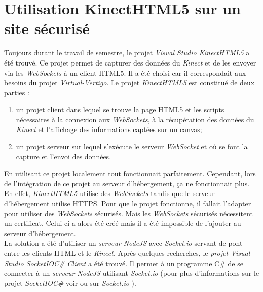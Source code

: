 \section*{Utilisation KinectHTML5 sur un site sécurisé}  \label{probKinectHTML5}
Toujours durant le travail de semestre, le projet \textit{Visual Studio KinectHTML5} \cite{KinectHTML5} a été trouvé. Ce projet permet de capturer des données du \textit{Kinect} et de les envoyer via les \textit{WebSockets} à un client HTML5. Il a été choisi car il correspondait aux besoins du projet \textit{Virtual-Vertigo}. Le projet \textit{KinectHTML5} est constitué de deux parties :
\begin{enumerate}
\item un projet client dans lequel se trouve la page HTML5 et les scripts nécessaires à la connexion aux \textit{WebSockets}, à la récupération des données du \textit{Kinect} et l'affichage des informations captées sur un canvas;
\item un projet serveur sur lequel s'exécute le serveur \textit{WebSocket} et où se font la capture et l'envoi des données.\\

\end{enumerate}

En utilisant ce projet localement tout fonctionnait parfaitement. Cependant, lors de l'intégration de ce projet au serveur d'hébergement, ça ne fonctionnait plus. En effet, \textit{KinectHTML5} utilise des \textit{WebSockets} tandis que le serveur d'hébergement utilise HTTPS. Pour que le projet fonctionne, il fallait l'adapter pour utiliser des \textit{WebSockets} sécurisés. Mais les \textit{WebSockets} sécurisés nécessitent un certificat. Celui-ci a alors été créé mais il a été impossible de l'ajouter au serveur d'hébergement. \\

La solution a été d'utiliser un \textit{serveur NodeJS} avec \textit{Socket.io} servant de pont entre les clients HTML et le \textit{Kinect}. Après quelques recherches, le \textit{projet Visual Studio SocketIOC\# Client} a été trouvé. Il permet à un programme C\# de se connecter à un \textit{serveur NodeJS} utilisant \textit{Socket.io} (pour plus d'informations sur le projet \textit{SocketIOC\#} voir \cite{SocketIOCSharp} ou sur \textit{Socket.io} \cite{SocketIO}).



